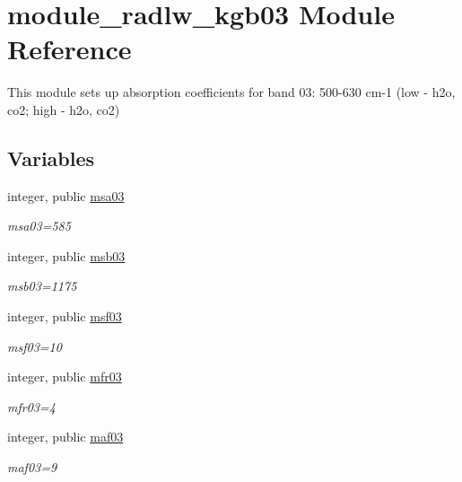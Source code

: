 \hypertarget{namespacemodule__radlw__kgb03}{}\section{module\+\_\+radlw\+\_\+kgb03 Module Reference}
\label{namespacemodule__radlw__kgb03}


This module sets up absorption coefficients for band 03\+: 500-\/630 cm-\/1 (low -\/ h2o, co2; high -\/ h2o, co2)  


\subsection*{Variables}
\begin{DoxyCompactItemize}
\item 
\mbox{\label{namespacemodule__radlw__kgb03_a78658032153f7a4cbeaa198cbe661244}} 
integer, public \hyperlink{namespacemodule__radlw__kgb03_a78658032153f7a4cbeaa198cbe661244}{msa03}
\begin{DoxyCompactList}\small\item\em msa03=585 \end{DoxyCompactList}\item 
integer, public \hyperlink{group__module__radlw__kgbnn_gac57ba9584cbc3a5e4e2e0a6b548d21e9}{msb03}
\begin{DoxyCompactList}\small\item\em msb03=1175 \end{DoxyCompactList}\item 
integer, public \hyperlink{group__module__radlw__kgbnn_gaf553bb46aa3ea6bcbb945cb2c2778955}{msf03}
\begin{DoxyCompactList}\small\item\em msf03=10 \end{DoxyCompactList}\item 
integer, public \hyperlink{group__module__radlw__kgbnn_ga4ea1e58a39585adc087718b92a16b529}{mfr03}
\begin{DoxyCompactList}\small\item\em mfr03=4 \end{DoxyCompactList}\item 
integer, public \hyperlink{group__module__radlw__kgbnn_ga90d1081db011f0682cb4a83c40c5bb23}{maf03}
\begin{DoxyCompactList}\small\item\em maf03=9 \end{DoxyCompactList}\item 

\end{DoxyCompactItemize}
